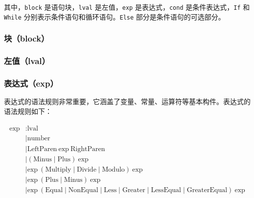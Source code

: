 \documentclass[../main.tex]{subfiles}
\begin{document}
其中，\texttt{block} 是语句块，\texttt{lval} 是左值，\texttt{exp} 是表达式，\texttt{cond} 是条件表达式，\texttt{If} 和 \texttt{While} 分别表示条件语句和循环语句。\texttt{Else} 部分是条件语句的可选部分。

\subsubsection{块（block）}


\subsubsection{左值（lval）}


\subsubsection{表达式（exp）}

表达式的语法规则非常重要，它涵盖了变量、常量、运算符等基本构件。表达式的语法规则如下：

\begin{gather*}
	\begin{aligned}
		\text{exp} & \colon  \text{lval}                                                                                                                                    \\
		           & \mid \text{number}                                                                                                                                     \\
		           & \mid \text{LeftParen} \ \text{exp} \ \text{RightParen}                                                                                                 \\
		           & \mid (\text{Minus} \mid \text{Plus}) \ \text{exp}                                                                                                      \\
		           & \mid \text{exp} \ (\text{Multiply} \mid \text{Divide} \mid \text{Modulo}) \ \text{exp}                                                                 \\
		           & \mid \text{exp} \ (\text{Plus} \mid \text{Minus}) \ \text{exp}                                                                                         \\
		           & \mid \text{exp} \ (\text{Equal} \mid \text{NonEqual} \mid \text{Less} \mid \text{Greater} \mid \text{LessEqual} \mid \text{GreaterEqual}) \ \text{exp}
	\end{aligned}
\end{gather*}
\end{document}
